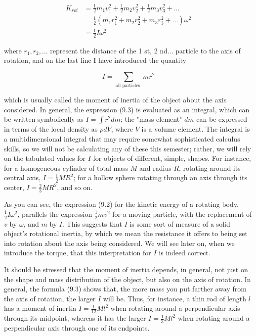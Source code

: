 \documentclass[10pt]{article}
\begin{document}
\begin{align*}
K_{r o t} & =\frac{1}{2} m_{1} v_{1}^{2}+\frac{1}{2} m_{2} v_{2}^{2}+\frac{1}{2} m_{3} v_{3}^{2}+\ldots \\
& =\frac{1}{2}\left(m_{1} r_{1}^{2}+m_{2} r_{2}^{2}+m_{3} r_{3}^{2}+\ldots\right) \omega^{2} \\
& =\frac{1}{2} I \omega^{2} \tag{9.2}
\end{align*}


where $r_{1}, r_{2}, \ldots$ represent the distance of the 1 st, 2 nd... particle to the axis of rotation, and on the last line I have introduced the quantity


\begin{equation*}
I=\sum_{\text {all particles }} m r^{2} \tag{9.3}
\end{equation*}


which is usually called the moment of inertia of the object about the axis considered. In general, the expression (9.3) is evaluated as an integral, which can be written symbolically as $I=\int r^{2} d m$; the "mass element" $d m$ can be expressed in terms of the local density as $\rho d V$, where $V$ is a volume element. The integral is a multidimensional integral that may require somewhat sophisticated calculus skills, so we will not be calculating any of these this semester; rather, we will rely on the tabulated values for $I$ for objects of different, simple, shapes. For instance, for a homogeneous cylinder of total mass $M$ and radius $R$, rotating around its central axis, $I=\frac{1}{2} M R^{2}$; for a hollow sphere rotating through an axis through its center, $I=\frac{2}{3} M R^{2}$, and so on.

As you can see, the expression (9.2) for the kinetic energy of a rotating body, $\frac{1}{2} I \omega^{2}$, parallels the expression $\frac{1}{2} m v^{2}$ for a moving particle, with the replacement of $v$ by $\omega$, and $m$ by $I$. This suggests that $I$ is some sort of measure of a solid object's rotational inertia, by which we mean the resistance it offers to being set into rotation about the axis being considered. We will see later on, when we introduce the torque, that this interpretation for $I$ is indeed correct.

It should be stressed that the moment of inertia depends, in general, not just on the shape and mass distribution of the object, but also on the axis of rotation. In general, the formula (9.3) shows that, the more mass you put farther away from the axis of rotation, the larger $I$ will be. Thus, for instance, a thin rod of length $l$ has a moment of inertia $I=\frac{1}{12} M l^{2}$ when rotating around a perpendicular axis through its midpoint, whereas it has the larger $I=\frac{1}{3} M l^{2}$ when rotating around a perpendicular axis through one of its endpoints.
\end{document}
